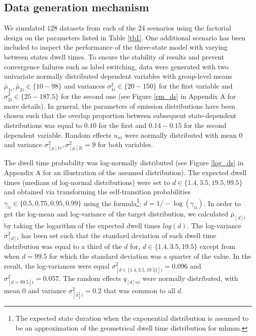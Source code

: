 \subsection{Data generation mechanism }
We simulated $128$ datasets from each of the $24$ scenarios using the factorial design on the parameters listed in Table \ref{tb1}. One additional scenario has been included to inspect the performance of the three-state model with varying between states dwell times. To ensure the stability of results and prevent convergence failures such as label switching, data were generated with two univariate normally distributed dependent variables with group-level means ${\bar{\mu}_{1i},\bar{\mu}_{2i}\in \{10-98\}}$ and variances ${\sigma_{1i}^2 \in \{20-150\}}$ for the first variable and ${\sigma_{2i}^2 \in \{25-187.5\}}$ for the second one (see Figure \ref{em_ds} in Appendix A for more details). In general, the parameters of emission distributions have been chosen such that the overlap proportion between subsequent state-dependent distributions was equal to $0.10$ for the first and $0.14-0.15$ for the second dependent variable. Random effects $u_{ni}$ were normally distributed with mean $0$ and variance ${\sigma^2_{[\mu]1i},\sigma^2_{[\mu]2i}=9}$ for both variables.

The dwell time probability was log-normally distributed (see Figure \ref{log_ds} in Appendix A for an illustration of the assumed distribution). The expected dwell times (medians of log-normal distributions) were set to ${d\in \{1.4,3.5,19.5,99.5\}}$ and obtained via transforming the self-transition probabilities ${\gamma_{ii} \in \{0.5, 0.75, 0.95, 0.99\}}$ using the formula\footnote{The expected state duration when the exponential distribution is assumed to be an approximation of the geometrical dwell time distribution for \ac{mhmm}.}: ${d=1/-\log(\gamma_{ii})}$. In order to get the log-mean and log-variance of the target distribution, we calculated ${\bar{\mu}_{[d]i}}$ by taking the logarithm of the expected dwell times $log(d)$. The log-variance ${\bar{\sigma}^2_{[d]i}}$ has been set such that the standard deviation of each dwell time distribution was equal to a third of the $d$ for, ${d\in \{1.4,3.5,19.5\}}$ except from when $d=99.5$ for which the standard deviation was a quarter of the value. In the result, the log-variances were equal ${\sigma^2_{[d\in \{1.4,3.5,19.5\}]i}}=0.096$ and ${\sigma^2_{[d=99.5]i}}=0.057$. The random effects $q_{[d]ni}$ were normally distributed, with mean $0$ and variance $\sigma^{2}_{[\bar{d}]i}=0.2$ that was common to all $d$. 

